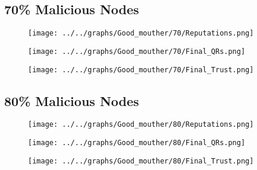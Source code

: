 \begin{minipage}[t]{0.49\columnwidth}
\subsection*{70\% Malicious Nodes}
    \begin{figure}[H]
        \centering
        \texttt{[image: ../../graphs/Good\_mouther/70/Reputations.png]}
    \end{figure}
    \begin{figure}[H]
        \centering
        \texttt{[image: ../../graphs/Good\_mouther/70/Final\_QRs.png]}
    \end{figure}
\end{minipage}
\begin{minipage}[t]{0.49\columnwidth}
    \begin{figure}[H]
        \centering
        \texttt{[image: ../../graphs/Good\_mouther/70/Final\_Trust.png]}
    \end{figure}
\end{minipage}

\begin{minipage}[t]{0.49\columnwidth}
\subsection*{80\% Malicious Nodes}
    \begin{figure}[H]
        \centering
        \texttt{[image: ../../graphs/Good\_mouther/80/Reputations.png]}
    \end{figure}
    \begin{figure}[H]
        \centering
        \texttt{[image: ../../graphs/Good\_mouther/80/Final\_QRs.png]}
    \end{figure}
\end{minipage}
\begin{minipage}[t]{0.49\columnwidth}
    \begin{figure}[H]
        \centering
        \texttt{[image: ../../graphs/Good\_mouther/80/Final\_Trust.png]}
    \end{figure}
\end{minipage}

